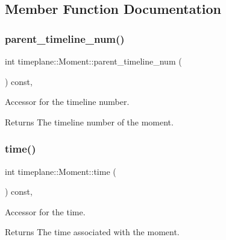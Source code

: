 \subsection{Member Function Documentation}
\mbox{\label{classtimeplane_1_1_moment_ad8ea04fc7e079694a0843ff7b3f42c6c}} 
\subsubsection{\texorpdfstring{parent\+\_\+timeline\+\_\+num()}{parent\_timeline\_num()}}
{\footnotesize\ttfamily int timeplane\+::\+Moment\+::parent\+\_\+timeline\+\_\+num (\begin{DoxyParamCaption}{ }\end{DoxyParamCaption}) const\hspace{0.3cm}{\ttfamily [inline]}, {\ttfamily [noexcept]}}



Accessor for the timeline number. 

\begin{DoxyReturn}{Returns}
The timeline number of the moment. 
\end{DoxyReturn}
\mbox{\label{classtimeplane_1_1_moment_a118be8757aa459d4d6e4d859a5164251}} 
\subsubsection{\texorpdfstring{time()}{time()}}
{\footnotesize\ttfamily int timeplane\+::\+Moment\+::time (\begin{DoxyParamCaption}{ }\end{DoxyParamCaption}) const\hspace{0.3cm}{\ttfamily [inline]}, {\ttfamily [noexcept]}}



Accessor for the time. 

\begin{DoxyReturn}{Returns}
The time associated with the moment. 
\end{DoxyReturn}
\mbox{\label{classtimeplane_1_1_moment_abe69bf9b6e324f3147c9f1ed078b9d0c}} 

